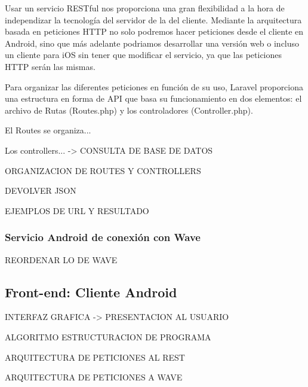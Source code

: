 Usar un servicio RESTful nos proporciona una gran flexibilidad a la hora de independizar la tecnología del servidor de la del cliente. Mediante la arquitectura basada en peticiones HTTP no solo podremos hacer peticiones desde el cliente en Android, sino que más adelante podriamos desarrollar una versión web o incluso un cliente para iOS sin tener que modificar el servicio, ya que las peticiones HTTP serán las mismas.

Para organizar las diferentes peticiones en función de su uso, Laravel proporciona una estructura en forma de API que basa su funcionamiento en dos elementos: el archivo de Rutas (Routes.php) y los controladores (Controller.php).

El Routes se organiza...

Los controllers... -> CONSULTA DE BASE DE DATOS

ORGANIZACION DE ROUTES Y CONTROLLERS

DEVOLVER JSON

EJEMPLOS DE URL Y RESULTADO

\subsubsection{Servicio Android de conexión con Wave}

REORDENAR LO DE WAVE

\subsection{Front-end: Cliente Android}

INTERFAZ GRAFICA -> PRESENTACION AL USUARIO

ALGORITMO ESTRUCTURACION DE PROGRAMA

ARQUITECTURA DE PETICIONES AL REST

ARQUITECTURA DE PETICIONES A WAVE

